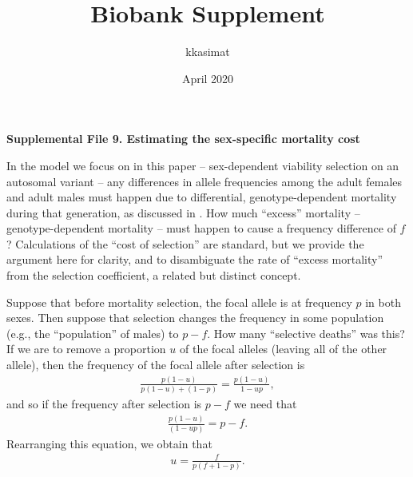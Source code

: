\documentclass{article}
\title{Biobank Supplement}
\author{kkasimat}
\date{April 2020}
\begin{document}
\noindent
\textbf{Supplemental File 9. Estimating the sex-specific mortality cost}

\noindent
In the model we focus on in this paper -- sex-dependent viability selection on an autosomal variant --
any differences in allele frequencies among the adult females and adult males
must happen due to differential, genotype-dependent mortality during that generation,
as discussed in \citet{Kasimatis:2019cs}.
How much ``excess'' mortality -- genotype-dependent mortality --
must happen to cause a frequency difference of $f$?
Calculations of the ``cost of selection'' \citep{Haldane:1957ka} are standard,
but we provide the argument here for clarity,
and to disambiguate the rate of ``excess mortality'' from the selection coefficient,
a related but distinct concept.

Suppose that before mortality selection, the focal allele is at frequency $p$ in both sexes.
Then suppose that selection changes the frequency in some population (e.g., the ``population'' of males)
to $p - f$.
How many ``selective deaths'' was this?
If we are to remove a proportion $u$ of the focal alleles (leaving all of the other allele),
then the frequency of the focal allele after selection is
\begin{align*}
    \frac{p (1-u)}{p (1-u) + (1 - p)} = \frac{p (1-u)}{1 - u p},
\end{align*}
and so if the frequency after selection is $p-f$ we need that
\begin{align*}
    \frac{p (1-u)}{(1 - u p)} = p - f  .
\end{align*}
Rearranging this equation,
we obtain that
\begin{align*}
    u = \frac{f}{p (f + 1 - p)} .
\end{align*}

\end{document}
